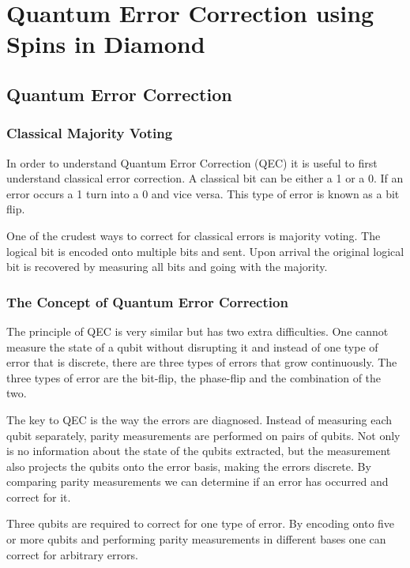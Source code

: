 \chapter{Quantum Error Correction using Spins in Diamond}
\label{quantumerrorcorrectionusingspinsindiamond}

\section{Quantum Error Correction}
\label{quantumerrorcorrection}

\subsection{Classical Majority Voting}
\label{classicalmajorityvoting}

In order to understand Quantum Error Correction (QEC) it is useful to first understand classical error correction. A classical bit can be either a 1 or a 0. If an error occurs a 1 turn into a 0 and vice versa. This type of error is known as a bit flip. 

One of the crudest ways to correct for classical errors is majority voting. The logical bit is encoded onto multiple bits and sent. Upon arrival the original logical bit is recovered by measuring all bits and going with the majority. 

\subsection{The Concept of Quantum Error Correction}
\label{theconceptofquantumerrorcorrection}

The principle of QEC is very similar but has two extra difficulties. One cannot measure the state of a qubit without disrupting it and instead of one type of error that is discrete, there are three types of errors that grow continuously. The three types of error are the bit-flip, the phase-flip and the combination of the two. 

The key to QEC is the way the errors are diagnosed. Instead of measuring each qubit separately, parity measurements are performed on pairs of qubits. Not only is no information about the state of the qubits extracted, but the measurement also projects the qubits onto the error basis, making the errors discrete. By comparing parity measurements we can determine if an error has occurred and correct for it. 

Three qubits are required to correct for one type of error. By encoding onto five or more qubits and performing parity measurements in different bases one can correct for arbitrary errors. 

